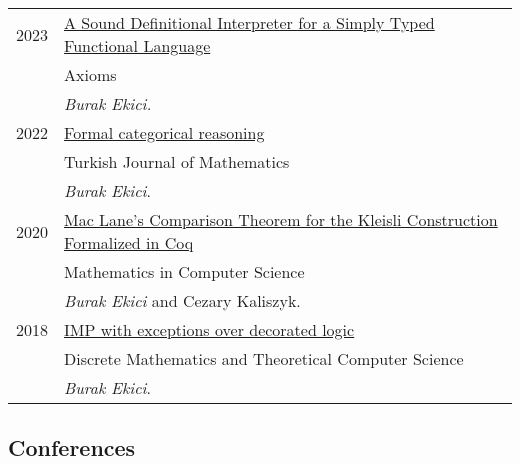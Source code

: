 \documentclass[a4paper,9pt]{article} %
\begin{document}
\begin{tabular}{ll}	
2023 & {\href{https://www.mdpi.com/2075-1680/12/1/43/pdf}{A Sound Definitional Interpreter for a Simply Typed Functional Language}}\\
& Axioms\\
&  \emph{Burak Ekici.}
 \\[0.20cm]
2022 &
{\href{https://journals.tubitak.gov.tr/cgi/viewcontent.cgi?article=3178&context=math}{Formal categorical reasoning}}\\
& Turkish Journal of Mathematics\\
& \emph{Burak Ekici}.
 \\[0.20cm]
2020 &
{\href{https://link.springer.com/content/pdf/10.1007%2Fs11786-020-00450-8.pdf}{Mac Lane’s Comparison Theorem for the Kleisli
Construction Formalized in Coq}}\\
& Mathematics in Computer Science\\
& \emph{Burak Ekici} and Cezary Kaliszyk.
 \\[0.20cm]
2018 & 
\href{https://dmtcs.episciences.org/4927}{IMP with exceptions over decorated logic}\\
& Discrete Mathematics and Theoretical Computer Science\\
& \emph{Burak Ekici}.
\end{tabular}

\subsection*{Conferences}
\end{document}
